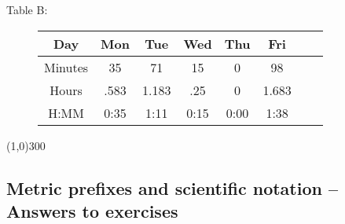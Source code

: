  \bigskip
\begin{description}
\item[\quad Table B: \quad] 
\begin{tabular} {|c| |c|c |c|c |c|c |c|}\hline
Day & Mon & Tue & Wed & Thu & Fri \\ \hline
Minutes & 35 & 71 & 15 & 0 & 98\\ \hline
Hours & .583 & 1.183 & .25 &0 & 1.683\\ \hline
H:MM & 0:35 & 1:11 & 0:15 & 0:00 & 1:38 \\ \hline
\end{tabular}
\end{description}
\bigskip 

\begin{center}
\line(1,0){300} %
\end{center}

\subsection {Metric prefixes and scientific notation -- Answers to exercises} %

